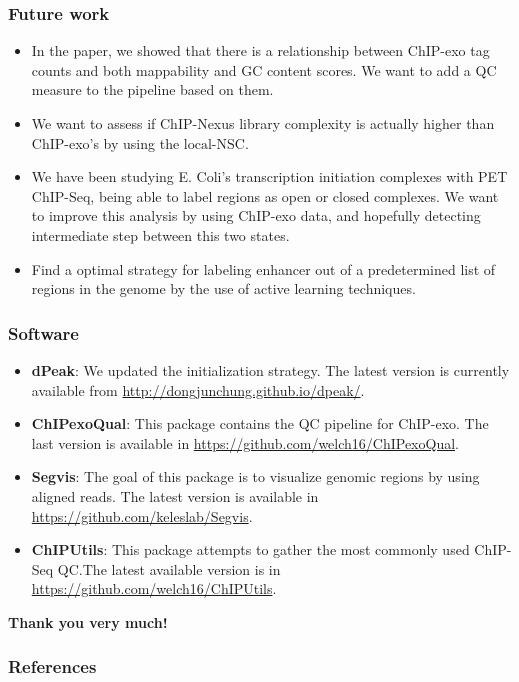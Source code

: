 \documentclass[compress,table,xcolor=dvipsnames]{beamer}\usepackage[]{graphicx}\usepackage[]{color}
\begin{document}
\begin{frame}
\frametitle{Future work}  

\begin{itemize}
\item In the paper, we showed that there is a relationship between
  ChIP-exo tag counts and both mappability and GC content scores. We
  want to add a QC measure to the pipeline based on them.
\item We want to assess if ChIP-Nexus library complexity is actually higher than ChIP-exo's by using the $\mbox{local-NSC}$.
\item We have been studying E. Coli's transcription initiation
  complexes with PET ChIP-Seq, being able to label regions as open or
  closed complexes. We want to improve this analysis by using ChIP-exo
  data, and hopefully detecting intermediate step between this two
  states.
\item Find a optimal strategy for labeling enhancer out of a
  predetermined list of regions in the genome by the use of active
  learning techniques.
\end{itemize}

\end{frame}

\begin{frame}[t]
\frametitle{Software}  
\begin{itemize}
\item {\color{RoyalBlue}\textbf{dPeak}}: We updated the initialization
  strategy. The latest version is currently available from
  \url{http://dongjunchung.github.io/dpeak/}.
\item {\color{RoyalBlue}\textbf{ChIPexoQual}}: This package contains
  the QC pipeline for ChIP-exo. The last version is available in
  \url{https://github.com/welch16/ChIPexoQual}.
\item {\color{RoyalBlue}\textbf{Segvis}}: The goal of this package is
  to visualize genomic regions by using aligned reads. The latest
  version is available in \url{https://github.com/keleslab/Segvis}.
\item {\color{RoyalBlue}\textbf{ChIPUtils}}: This package attempts to
  gather the most commonly used ChIP-Seq QC.The latest available
  version is in \url{https://github.com/welch16/ChIPUtils}.
\end{itemize}

\end{frame}

\begin{frame}[plain]
  
{\Huge
{\color{RoyalBlue}
\begin{center}
  \textbf{Thank you very much!}
\end{center}
}
}


\end{frame}


\begin{frame}[allowframebreaks]
  \frametitle{References}

{\tiny

\nocite{exo1}
\nocite{dpeak}



}

\end{frame}
\end{document}
